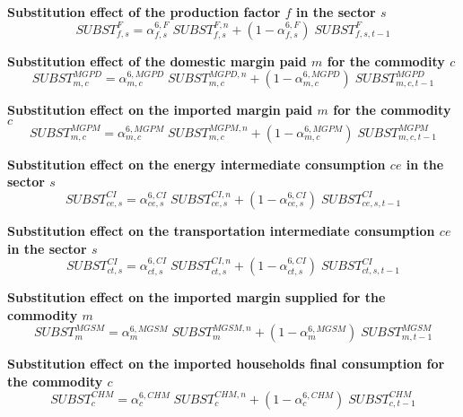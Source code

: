 \documentclass[12pt]{article}
\numberwithin{equation}{section}
\begin{document}
\noindent \textbf{Substitution effect of the production factor $f$ in the sector $s$} 
\begin{dmath}
SUBST^{F}_{f, s} = \alpha^{{6},F}_{f, s} \; SUBST^{F,n}_{f, s} + \left( 1 - \alpha^{{6},F}_{f, s} \right) \; SUBST^{F}_{f, s, t-1}
\label{adjustments.mdlSUBST_F[f, s]}
\end{dmath}

\noindent \textbf{Substitution effect of the domestic margin paid $m$ for the commodity $c$} 
\begin{dmath}
SUBST^{MGPD}_{m, c} = \alpha^{{6},MGPD}_{m, c} \; SUBST^{MGPD,n}_{m, c} + \left( 1 - \alpha^{{6},MGPD}_{m, c} \right) \; SUBST^{MGPD}_{m, c, t-1}
\label{adjustments.mdlSUBST_MGPD[m, c]}
\end{dmath}

\noindent \textbf{Substitution effect on the imported margin paid $m$ for the commodity $c$} 
\begin{dmath}
SUBST^{MGPM}_{m, c} = \alpha^{{6},MGPM}_{m, c} \; SUBST^{MGPM,n}_{m, c} + \left( 1 - \alpha^{{6},MGPM}_{m, c} \right) \; SUBST^{MGPM}_{m, c, t-1}
\label{adjustments.mdlSUBST_MGPM[m, c]}
\end{dmath}

\noindent \textbf{Substitution effect on the energy intermediate consumption $ce$ in the sector $s$} 
\begin{dmath}
SUBST^{CI}_{ce, s} = \alpha^{{6},CI}_{ce, s} \; SUBST^{CI,n}_{ce, s} + \left( 1 - \alpha^{{6},CI}_{ce, s} \right) \; SUBST^{CI}_{ce, s, t-1}
\label{adjustments.mdlSUBST_CI[ce, s]}
\end{dmath}

\noindent \textbf{Substitution effect on the transportation intermediate consumption $ce$ in the sector $s$} 
\begin{dmath}
SUBST^{CI}_{ct, s} = \alpha^{{6},CI}_{ct, s} \; SUBST^{CI,n}_{ct, s} + \left( 1 - \alpha^{{6},CI}_{ct, s} \right) \; SUBST^{CI}_{ct, s, t-1}
\label{adjustments.mdlSUBST_CI[ct, s]}
\end{dmath}

\noindent \textbf{Substitution effect on the imported margin supplied for the commodity $m$} 
\begin{dmath}
SUBST^{MGSM}_{m} = \alpha^{{6},MGSM}_{m} \; SUBST^{MGSM,n}_{m} + \left( 1 - \alpha^{{6},MGSM}_{m} \right) \; SUBST^{MGSM}_{m, t-1}
\label{adjustments.mdlSUBST_MGSM[m]}
\end{dmath}

\noindent \textbf{Substitution effect on the imported households final consumption for the commodity $c$} 
\begin{dmath}
SUBST^{CHM}_{c} = \alpha^{{6},CHM}_{c} \; SUBST^{CHM,n}_{c} + \left( 1 - \alpha^{{6},CHM}_{c} \right) \; SUBST^{CHM}_{c, t-1}
\label{adjustments.mdlSUBST_CHM[c]}
\end{dmath}
\end{document}
